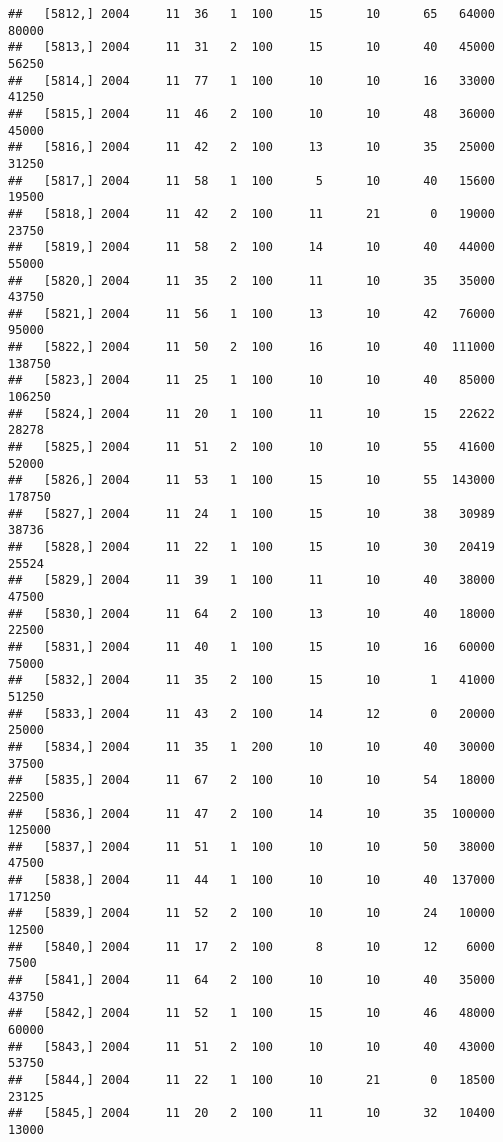 \documentclass{article}\usepackage[]{graphicx}\usepackage[]{color}
\makeatletter
\newenvironment{kframe}{%
 \def\at@end@of@kframe{}%
 \ifinner\ifhmode%
  \def\at@end@of@kframe{\end{minipage}}%
  \begin{minipage}{\columnwidth}%
 \fi\fi%
 \def\FrameCommand##1{\hskip\@totalleftmargin \hskip-\fboxsep
 \colorbox{shadecolor}{##1}\hskip-\fboxsep
     \hskip-\linewidth \hskip-\@totalleftmargin \hskip\columnwidth}%
 \MakeFramed {\advance\hsize-\width
   \@totalleftmargin\z@ \linewidth\hsize
   \@setminipage}}%
 {\par\unskip\endMakeFramed%
 \at@end@of@kframe}
\newenvironment{knitrout}{}{} %
\makeatother
\begin{document}
\begin{knitrout}
\begin{kframe}
\begin{verbatim}
##   [5812,] 2004     11  36   1  100     15      10      65   64000   80000
##   [5813,] 2004     11  31   2  100     15      10      40   45000   56250
##   [5814,] 2004     11  77   1  100     10      10      16   33000   41250
##   [5815,] 2004     11  46   2  100     10      10      48   36000   45000
##   [5816,] 2004     11  42   2  100     13      10      35   25000   31250
##   [5817,] 2004     11  58   1  100      5      10      40   15600   19500
##   [5818,] 2004     11  42   2  100     11      21       0   19000   23750
##   [5819,] 2004     11  58   2  100     14      10      40   44000   55000
##   [5820,] 2004     11  35   2  100     11      10      35   35000   43750
##   [5821,] 2004     11  56   1  100     13      10      42   76000   95000
##   [5822,] 2004     11  50   2  100     16      10      40  111000  138750
##   [5823,] 2004     11  25   1  100     10      10      40   85000  106250
##   [5824,] 2004     11  20   1  100     11      10      15   22622   28278
##   [5825,] 2004     11  51   2  100     10      10      55   41600   52000
##   [5826,] 2004     11  53   1  100     15      10      55  143000  178750
##   [5827,] 2004     11  24   1  100     15      10      38   30989   38736
##   [5828,] 2004     11  22   1  100     15      10      30   20419   25524
##   [5829,] 2004     11  39   1  100     11      10      40   38000   47500
##   [5830,] 2004     11  64   2  100     13      10      40   18000   22500
##   [5831,] 2004     11  40   1  100     15      10      16   60000   75000
##   [5832,] 2004     11  35   2  100     15      10       1   41000   51250
##   [5833,] 2004     11  43   2  100     14      12       0   20000   25000
##   [5834,] 2004     11  35   1  200     10      10      40   30000   37500
##   [5835,] 2004     11  67   2  100     10      10      54   18000   22500
##   [5836,] 2004     11  47   2  100     14      10      35  100000  125000
##   [5837,] 2004     11  51   1  100     10      10      50   38000   47500
##   [5838,] 2004     11  44   1  100     10      10      40  137000  171250
##   [5839,] 2004     11  52   2  100     10      10      24   10000   12500
##   [5840,] 2004     11  17   2  100      8      10      12    6000    7500
##   [5841,] 2004     11  64   2  100     10      10      40   35000   43750
##   [5842,] 2004     11  52   1  100     15      10      46   48000   60000
##   [5843,] 2004     11  51   2  100     10      10      40   43000   53750
##   [5844,] 2004     11  22   1  100     10      21       0   18500   23125
##   [5845,] 2004     11  20   2  100     11      10      32   10400   13000

\end{verbatim}
\end{kframe}
\end{knitrout}
\end{document}
